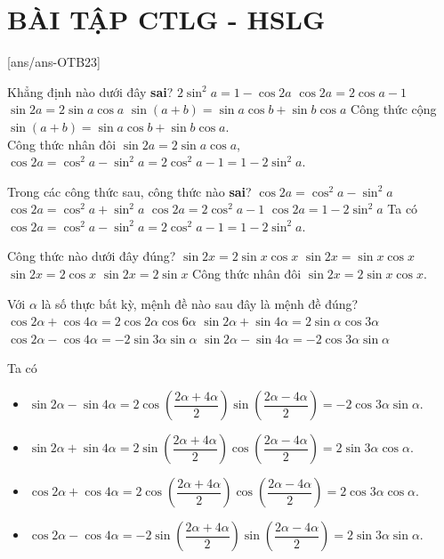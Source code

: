 ﻿\section*{BÀI TẬP CTLG - HSLG}
\setcounter{ex}{0}\setcounter{bt}{0}
[ans/ans-OTB23]

\begin{ex}%
Khẳng định nào dưới đây \textbf{sai}?
\choice
{$2\sin^2 a=1-\cos 2a$}
{\True $\cos 2a=2\cos a-1$}
{$\sin 2a=2\sin a \cos a$}
{$\sin (a+b)=\sin a\cos b+\sin b\cos a$}
\loigiai
{
Công thức cộng $\sin (a+b)=\sin a\cos b+\sin b\cos a$.\\
Công thức nhân đôi $\sin 2a=2\sin a\cos a$, $\cos 2a=\cos^2 a-\sin^2 a= 2\cos^2 a-1 = 1-2\sin^2 a$.
}
\end{ex}

\begin{ex}%
Trong các công thức sau, công thức nào \textbf{sai}?
\choice
{$\cos 2a=\cos^2 a-\sin^2 a$}
{\True $\cos 2a=\cos^2 a+\sin^2 a$}
{$\cos 2a=2\cos^2 a-1$}
{$\cos 2a=1-2\sin^2 a$}
\loigiai
{
Ta có $\cos 2a=\cos^2 a-\sin^2 a= 2\cos^2 a-1 = 1-2\sin^2 a$.
}
\end{ex}

\begin{ex}%
Công thức nào dưới đây đúng?
\choice
{\True $\sin 2x=2\sin x \cos x$}
{$\sin 2x=\sin x \cos x$}
{$\sin 2x=2\cos x$}
{$\sin 2x=2\sin x$}
\loigiai
{
Công thức nhân đôi $\sin 2x=2\sin x\cos x$.
}
\end{ex}

\begin{ex}%
Với $\alpha$ là số thực bất kỳ, mệnh đề nào sau đây là mệnh đề đúng?
\choice
{$\cos 2\alpha+\cos 4\alpha=2\cos 2\alpha \cos 6\alpha$}
{$\sin 2\alpha+\sin 4\alpha=2\sin \alpha\cos 3\alpha$}
{$\cos 2\alpha-\cos 4\alpha=-2\sin 3\alpha\sin \alpha$}
{\True $\sin 2\alpha-\sin 4\alpha=-2\cos 3\alpha \sin \alpha$}
\loigiai
{
Ta có
\begin{itemize}
\item $\sin 2\alpha-\sin 4\alpha = 2\cos\left(\dfrac{2\alpha+4\alpha}{2}\right)\sin\left(\dfrac{2\alpha-4\alpha}{2}\right)=-2\cos 3\alpha \sin \alpha$.
\item $\sin 2\alpha+\sin 4\alpha = 2\sin\left(\dfrac{2\alpha+4\alpha}{2}\right)\cos\left(\dfrac{2\alpha-4\alpha}{2}\right)=2\sin 3\alpha \cos \alpha$.
\item $\cos 2\alpha+\cos 4\alpha = 2\cos\left(\dfrac{2\alpha+4\alpha}{2}\right)\cos\left(\dfrac{2\alpha-4\alpha}{2}\right)=2\cos 3\alpha \cos \alpha$.
\item $\cos 2\alpha-\cos 4\alpha = -2\sin\left(\dfrac{2\alpha+4\alpha}{2}\right)\sin\left(\dfrac{2\alpha-4\alpha}{2}\right)=2\sin 3\alpha \sin \alpha$.
\end{itemize}
}
\end{ex}

